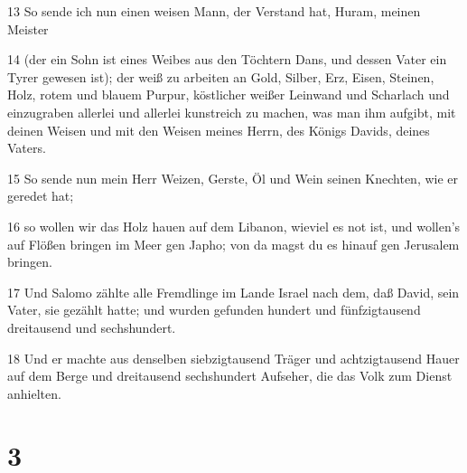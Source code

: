 \par 13 So sende ich nun einen weisen Mann, der Verstand hat, Huram, meinen Meister
\par 14 (der ein Sohn ist eines Weibes aus den Töchtern Dans, und dessen Vater ein Tyrer gewesen ist); der weiß zu arbeiten an Gold, Silber, Erz, Eisen, Steinen, Holz, rotem und blauem Purpur, köstlicher weißer Leinwand und Scharlach und einzugraben allerlei und allerlei kunstreich zu machen, was man ihm aufgibt, mit deinen Weisen und mit den Weisen meines Herrn, des Königs Davids, deines Vaters.
\par 15 So sende nun mein Herr Weizen, Gerste, Öl und Wein seinen Knechten, wie er geredet hat;
\par 16 so wollen wir das Holz hauen auf dem Libanon, wieviel es not ist, und wollen's auf Flößen bringen im Meer gen Japho; von da magst du es hinauf gen Jerusalem bringen.
\par 17 Und Salomo zählte alle Fremdlinge im Lande Israel nach dem, daß David, sein Vater, sie gezählt hatte; und wurden gefunden hundert und fünfzigtausend dreitausend und sechshundert.
\par 18 Und er machte aus denselben siebzigtausend Träger und achtzigtausend Hauer auf dem Berge und dreitausend sechshundert Aufseher, die das Volk zum Dienst anhielten.

\chapter{3}

